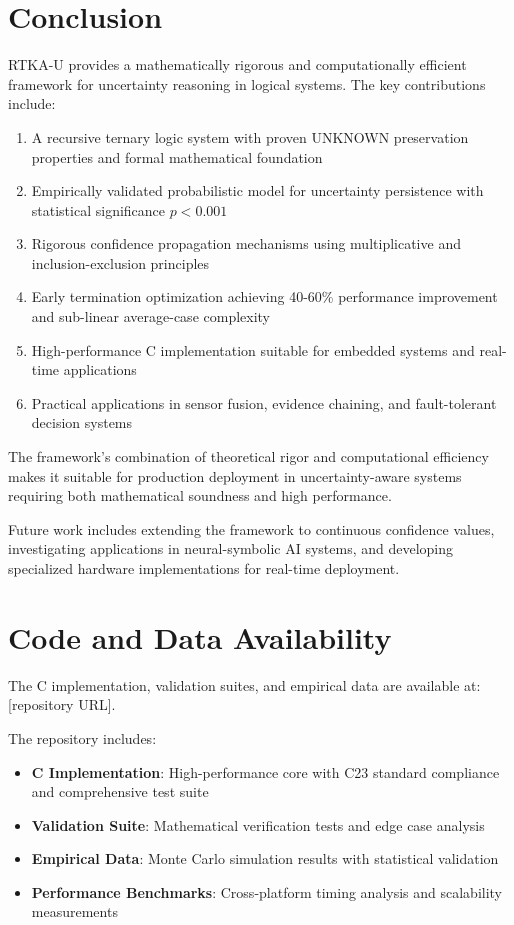 \documentclass[11pt,a4paper]{article}
\begin{document}
\section{Conclusion}

RTKA-U provides a mathematically rigorous and computationally efficient framework for uncertainty reasoning in logical systems. The key contributions include:

\begin{enumerate}
\item A recursive ternary logic system with proven UNKNOWN preservation properties and formal mathematical foundation
\item Empirically validated probabilistic model for uncertainty persistence with statistical significance $p < 0.001$
\item Rigorous confidence propagation mechanisms using multiplicative and inclusion-exclusion principles
\item Early termination optimization achieving 40-60\% performance improvement and sub-linear average-case complexity
\item High-performance C implementation suitable for embedded systems and real-time applications
\item Practical applications in sensor fusion, evidence chaining, and fault-tolerant decision systems
\end{enumerate}

The framework's combination of theoretical rigor and computational efficiency makes it suitable for production deployment in uncertainty-aware systems requiring both mathematical soundness and high performance.

Future work includes extending the framework to continuous confidence values, investigating applications in neural-symbolic AI systems, and developing specialized hardware implementations for real-time deployment.

\section{Code and Data Availability}

The C implementation, validation suites, and empirical data are available at: [repository URL].

The repository includes:
\begin{itemize}
\item \textbf{C Implementation}: High-performance core with C23 standard compliance and comprehensive test suite
\item \textbf{Validation Suite}: Mathematical verification tests and edge case analysis
\item \textbf{Empirical Data}: Monte Carlo simulation results with statistical validation
\item \textbf{Performance Benchmarks}: Cross-platform timing analysis and scalability measurements
\end{itemize}
\end{document}
